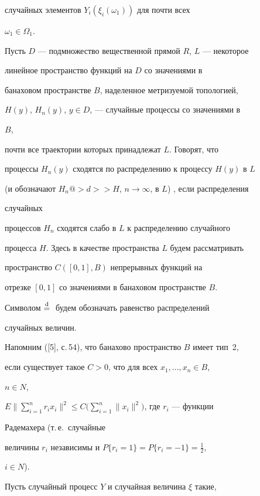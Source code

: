случайных элементов $Y_i(\xi_i(\omega_1))$ для почти всех 


$\omega_1\in\Omega_1$. 


 


Пусть $D$ --- подмножество вещественной прямой $R$, $L$ --- некоторое 


линейное пространство функций на $D$ со значениями в 


банаховом пространстве $B$, наделенное метризуемой топологией, 


$H(y)$, $H_n(y)$, $y\in D$, --- случайные процессы со значениями в 


$B$,  


почти все траектории которых принадлежат $L$. Говорят, что 


процессы $H_n(y)$ сходятся по распределению к процессу $H(y)$ в $L$ 


(и обозначают $H_n@>d>> H$, $n\to\infty$, в $L$) , если распределения 


случайных 


процессов $H_n$ сходятся слабо в $L$ к распределению случайного 


процесса $H$. Здесь в качестве пространства $L$ будем рассматривать 


пространство $C([0,1],B)$ непрерывных функций на 


отрезке $[0,1]$ со значениями в банаховом пространстве $B$. 


Символом $\overset{\mathrm{d}}{=}{}$ будем обозначать равенство распределений 


случайных величин. 


 


Напомним ([5], с.\,54), что банахово пространство $B$ имеет тип~2, 


если существует такое $C>0$, что для всех $x_1,\dotsc,x_n\in B$, 


$n\in N$, 


$E\Big\|\sum\limits^n_{i=1}r_i x_i\Big\|^2\le 


C\Big(\sum\limits^n_{i=1}\|x_i\|^2\Big)$, где $r_i$ --- функции 


Радемахера (т.\,е.~случайные 


величины $r_i$ независимы и $P\{r_i=1\}=P\{r_i=-1\}=\frac{1}{2}$, 


$i\in N$). 


 


Пусть случайный процесс $Y$ и случайная величина $\xi$ такие, 


